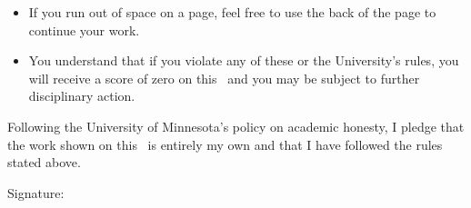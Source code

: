{\begin{singlespace}
\begin{itemize}[nosep]
  \item If you run out of space on a page, feel free to use the back of the page to continue your work.

  \item You understand that if you violate any of these or the University's rules, you will receive a score of zero on this \examtype\, and you may be subject to further disciplinary action.
\end{itemize}

{
  \setlength{\parindent}{0in}
  \vfill
  Following the University of Minnesota’s policy on academic honesty, I pledge that the work shown on this \examtype\ is entirely my own and that I have followed the rules stated above. 

  \vfill
  Signature: \hrulefill
}
\end{singlespace}

\begin{center}
  \pointtable[v][questions]
\end{center}
}
\makeatother
\newcommand{\PointsSection}{
  This quiz is worth \numpoints\ points and consists of \numquestions\ questions. You have 5 minutes to complete the quiz.

  \begin{center}
    \pointtable[v][questions]
  \end{center}
}

\usepackage{amsmath,amssymb}


